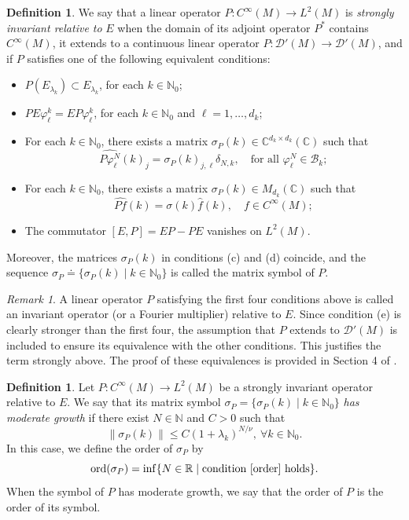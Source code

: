 \documentclass{amsart}
\theoremstyle{definition}
\newtheorem{definition}[theorem]{Definition}
\theoremstyle{remark}
\newtheorem{remark}[theorem]{Remark}
\numberwithin{equation}{section}
\begin{document}
	\begin{definition}
		We say that a linear operator $P:C^\infty(M)\to L^2(M)$ is \textit{strongly invariant relative to} $E$ when the domain of its adjoint operator $P^*$ contains $C^\infty(M)$, it extends to a continuous linear operator $P:\mathscr{D}'(M)\to\mathscr{D}'(M)$, and if $P$ satisfies one of the following equivalent conditions:
		\begin{itemize}
			\item[(a)] $P(E_{\lambda_k})\subset E_{\lambda_k}$, for each $k\in\mathbb{N}_0$;
			\item[(b)] $PE\varphi_\ell^k=EP\varphi_\ell^k$, for each $k\in\mathbb{N}_0$ and $\ell=1,\dots,d_k$;
			\item[(c)] For each $k\in\mathbb{N}_0$, there exists a matrix $\sigma_P(k)\in \mathbb{C}^{d_k\times d_k}(\mathbb{C})$ such that 
			$$
			\widehat{P\varphi_\ell^N}(k)_j=\sigma_P(k)_{j,\ell}\delta_{N,k},  \quad \text{for all } \varphi_\ell^N \in \mathcal{B}_k;
			$$
			\item[(d)] For each $k\in\mathbb{N}_0$, there exists a matrix $\sigma_P(k)\in M_{d_k}(\mathbb{C})$ such that 
			$$
			\widehat{Pf}(k)=\sigma(k)\widehat{f}(k), \quad f\in C^\infty(M);
			$$
			\item[(e)] The commutator $[E,P]=EP-PE$ vanishes on $L^2(M)$.
		\end{itemize}
	\end{definition}		
	
	Moreover, the matrices $\sigma_P(k)$ in conditions (c) and (d) coincide, and the sequence $\sigma_P \doteq \{\sigma_P(k)\mid k\in \mathbb{N}_0 \}$ is called the matrix symbol of $P$.	
	
	\begin{remark}
		A linear operator $P$ satisfying the first four conditions above is called an invariant operator (or a Fourier multiplier) relative to $E$. Since condition (e) is clearly stronger than the first four, the assumption that $P$ extends to $\mathscr{D}'(M)$ is included to ensure its equivalence with the other conditions. This justifies the term strongly above. The proof of these equivalences is provided in Section 4 of \cite{DR2018}.
	\end{remark}
	
	\begin{definition}
		Let $P:C^\infty(M)\to L^2(M)$ be a strongly invariant operator relative to $E$. We say that its matrix symbol  $\sigma_P = \{\sigma_P(k) \mid k\in \mathbb{N}_0 \}$ \textit{has moderate growth} if there exist $N\in\mathbb{N}$ and $C>0$ such that
		\begin{equation}\label{order}
			\|\sigma_P(k)\|\leq C(1+\lambda_k)^{N/\nu},\ \forall k\in\mathbb{N}_0.
		\end{equation}
		In this case, we define the order of $\sigma_P$ by
		\begin{equation*}
			\text{ord}(\sigma_P)=\inf\{N\in\mathbb{R} \mid \text{condition  \eqref{order} holds}\}.
		\end{equation*}
		When the symbol of $P$ has moderate growth, we say that the order of $P$ is the order of its symbol.
	\end{definition}
	
\end{document}
